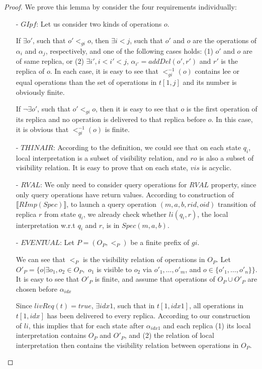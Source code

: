 {\begin {proof}
We prove this lemma by consider the four requirements individually:

\begin{itemize}
\setlength{\itemsep}{0.5pt}
\item[-] $\mathit{GIpf}$: Let us consider two kinds of operations $o$.

If $\exists o'$, such that $o' <_{gi} o$, then $\exists i < j$, such that $o'$ and $o$ are the operations of $\alpha_i$ and $\alpha_j$, respectively, and one of the following cases holds: (1) $o'$ and $o$ are of same replica, or (2) $\exists i', i < i' < j$, $\alpha_{i'}=addDel(o',r')$ and $r'$ is the replica of $o$. In each case, it is easy to see that $<^{-1}_{gi}(o)$ contains lee or equal operations than the set of operations in $t[1,j]$ and its number is obviously finite.

    If $\neg \exists o'$, such that $o' <_{gi} o$, then it is easy to see that $o$ is the first operation of its replica and no operation is delivered to that replica before $o$. In this case, it is obvious that $<^{-1}_{gi}(o)$ is finite.

\item[-] $\mathit{THINAIR}$: According to the definition, we could see that on each state $q_i$, local interpretation is a subset of visibility relation, and $ro$ is also a subset of visibility relation. It is easy to prove that on each state, $vis$ is acyclic.

\item[-] $\mathit{RVAL}$: We only need to consider query operations for $\mathit{RVAL}$ property, since only query operations have return values. According to construction of $\llbracket RImp(Spec) \rrbracket$, to launch a query operation $(m,a,b,rid,oid)$ transition of replica $r$ from state $q_i$, we already check whether $li(q_i,r)$, the local interpretation w.r.t $q_i$ and $r$, is in $Spec(m,a,b)$.

\item[-] $\mathit{EVENTUAL}$: Let $P=(O_P,<_P)$ be a finite prefix of $gi$.

We can see that $<_P$ is the visibility relation of operations in $O_P$. Let $O'_P = \{ o \vert \exists o_1,o_2 \in O_P,$ $o_1$ is visible to $o_2$ via $o'_1,\ldots,o'_m$, and $o \in \{ o'_1,\ldots,o'_n \} \}$. It is easy to see that $O'_P$ is finite, and assume that operations of $O_P \cup O'_P$ are chosen before $\alpha_{idx}$

Since $livReq(t)=true$, $\exists idx1$, such that in $t[1,idx1]$, all operations in $t[1,idx]$ has been delivered to every replica. According to our construction of $li$, this implies that for each state after $\alpha_{idx1}$ and each replica (1) its local interpretation contains $O_P$ and $O'_P$, and (2) the relation of local interpretation then contains the visibility relation between operations in $O_P$.
\end{itemize}


\end{proof}}
